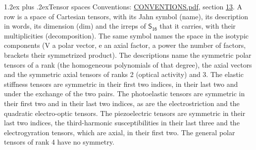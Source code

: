 \documentclass[10pt,a4paper]{article}
\makeatletter
\renewcommand\section{\@startsection{section}{1}{\z@}{-3ex plus -1ex minus -.2ex}%
  {1.2ex plus .2ex}{\normalfont\large\sffamily\bfseries\color{parttitle}}}
\numberwithin{equation}{section}
\newcommand{\grp}[1]{\mathsf{#1}}
\makeatother
\begin{document}
\section{Tensor spaces}\label{s:tensor_spaces}
Conventions: \href{../../CONVENTIONS.pdf}{CONVENTIONS.pdf}, section \href{../../CONVENTIONS.pdf\#conv.13}{13}.
\leavevmode\label{n:head.name}\label{n:head.description}\label{n:head.dim}\label{n:head.decomposition}A row is a space of Cartesian tensors, with its Jahn symbol (name), its description in words, its dimension (dim) and the irreps of $\grp{S_{16}}$ that it carries, with their multiplicities (decomposition). \label{n:label.jahn}The same symbol names the space in the isotypic components (V a polar vector, e an axial factor, a power the number of factors, brackets their symmetrized product). The descriptions name the symmetric polar tensors of a rank (the homogeneous polynomials of that degree), the axial vectors and the symmetric axial tensors of ranks 2 (optical activity) and 3. The elastic stiffness tensors are symmetric in their first two indices, in their last two and under the exchange of the two pairs. The photoelastic tensors are symmetric in their first two and in their last two indices, as are the electrostriction and the quadratic electro-optic tensors. The piezoelectric tensors are symmetric in their last two indices, the third-harmonic susceptibilities in their last three and the electrogyration tensors, which are axial, in their first two. The general polar tensors of rank 4 have no symmetry.
\end{document}
